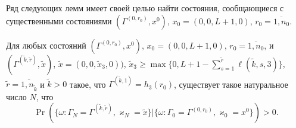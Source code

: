 \documentclass{report}
\begin{document}
Ряд следующих лемм имеет своей целью найти состояния, сообщающиеся с существенными состояниями $(\Gamma^{(0,r_0)},x^0)$, $x_0=(0,0,L+1,0)$, $r_0=\overline{1,n_0}$.
\begin{lemma}\label{incycle:states}
Для любых состояний $(\Gamma^{(0,r_0)},x^0)$, $x_0=(0,0,L+1,0)$, $r_0=\overline{1,n_0}$, и
$(\Gamma^{(\tilde{k},\tilde{r})},\tilde{x})$,
$\tilde{x}=(0,0,\tilde{x}_3,0))$, $\tilde{x}_3\geqslant\max{\{0,L+1-\sum_{s=1}^{\tilde{r}} \ell(\tilde{k},s,3)\}}$,
$\tilde{r} = \overline{1,n_{\tilde{k}}}$ 
и $\tilde{k}>0$ такое, что 
$\Gamma^{(\tilde{k},1)}=h_3(r_0)$, существует такое натуральное число $N$, что 
\begin{equation*}
\Pr(\{\omega\colon \Gamma_{N}=\Gamma^{(\tilde{k},\tilde{r} )}, \varkappa_{N}=\tilde{x}\}|\{\omega\colon 
\Gamma_{0}=\Gamma^{(0,r_0)}, \varkappa_{0}=x^0\})>0.
\end{equation*}
\end{lemma}
\end{document}
